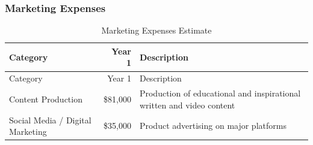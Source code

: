 \documentclass[10pt,openany]{book}
\begin{document}
\hypertarget{marketing-expenses}{%
\subsubsection{Marketing Expenses}\label{marketing-expenses}}

\begin{longtable}[]{@{}lrl@{}}
\caption{Marketing Expenses Estimate}\tabularnewline
\toprule
\begin{minipage}[b]{0.32\columnwidth}\raggedright
Category\strut
\end{minipage} & \begin{minipage}[b]{0.11\columnwidth}\raggedleft
Year 1\strut
\end{minipage} & \begin{minipage}[b]{0.48\columnwidth}\raggedright
Description\strut
\end{minipage}\tabularnewline
\midrule
\endfirsthead
\toprule
\begin{minipage}[b]{0.32\columnwidth}\raggedright
Category\strut
\end{minipage} & \begin{minipage}[b]{0.11\columnwidth}\raggedleft
Year 1\strut
\end{minipage} & \begin{minipage}[b]{0.48\columnwidth}\raggedright
Description\strut
\end{minipage}\tabularnewline
\midrule
\endhead
\begin{minipage}[t]{0.32\columnwidth}\raggedright
Content Production\strut
\end{minipage} & \begin{minipage}[t]{0.11\columnwidth}\raggedleft
\$81,000\strut
\end{minipage} & \begin{minipage}[t]{0.48\columnwidth}\raggedright
Production of educational and inspirational written and video
content\strut
\end{minipage}\tabularnewline
\begin{minipage}[t]{0.32\columnwidth}\raggedright
Social Media / Digital Marketing\strut
\end{minipage} & \begin{minipage}[t]{0.11\columnwidth}\raggedleft
\$35,000\strut
\end{minipage} & \begin{minipage}[t]{0.48\columnwidth}\raggedright
Product advertising on major platforms\strut
\end{minipage}\tabularnewline

\end{longtable}
\end{document}
